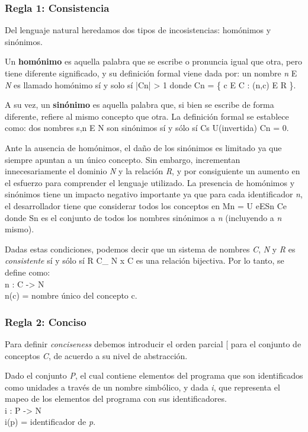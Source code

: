 \subsubsection{Regla 1: Consistencia}
Del lenguaje natural heredamos dos tipos de incosistencias: homónimos y sinónimos.

Un \textbf{homónimo} es aquella palabra que se escribe o pronuncia igual que otra, pero tiene diferente significado, y su definición formal viene dada por: un nombre \textit{n} E \textit{N} es llamado homónimo sí y solo sí |Cn| > 1 donde Cn = \{ c E C : (n,c) E R \}.

A su vez, un \textbf{sinónimo} es aquella palabra que, si bien se escribe de forma diferente, refiere al mismo concepto que otra. La definición formal se establece como: dos nombres s,n E N son sinónimos sí y sólo sí Cs U(invertida) Cn =\/ 0.

Ante la ausencia de homónimos, el daño de los sinónimos es limitado ya que siempre apuntan a un único concepto. Sin embargo, incrementan innecesariamente el dominio \textit{N} y la relación \textit{R}, y por consiguiente un aumento en el esfuerzo para comprender el lenguaje utilizado. La presencia de homónimos y sinónimos tiene un impacto negativo importante ya que para cada identificador \textit{n}, el desarrollador tiene que considerar todos los conceptos en
Mn = U eESn Ce
donde Sn es el conjunto de todos los nombres sinónimos a \textit{n} (incluyendo a \textit{n} mismo).

Dadas estas condiciones, podemos decir que un sistema de nombres \textit{C}, \textit{N} y \textit{R} es \textit{consistente} sí y sólo sí R C\_ N x C es una relación bijectiva. Por lo tanto, se define como:
\\n : C -> N
\\n(c) = nombre único del concepto c.

\subsubsection{Regla 2: Conciso}
Para definir \textit{conciseness} debemos introducir el orden parcial [ para el conjunto de conceptos \textit{C}, de acuerdo a su nivel de abstracción.

Dado el conjunto \textit{P}, el cual contiene elementos del programa que son identificados como unidades a través de un nombre simbólico, y dada \textit{i}, que representa el mapeo de los elementos del programa con sus identificadores.
\\i : P -> N
\\i(p) = identificador de \textit{p}.

